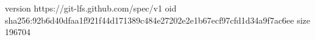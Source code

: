version https://git-lfs.github.com/spec/v1
oid sha256:92b6d40dfaa1f921f44d171389c484e27202e2e1b67ecf97cfd1d34a9f7ac6ee
size 196704
